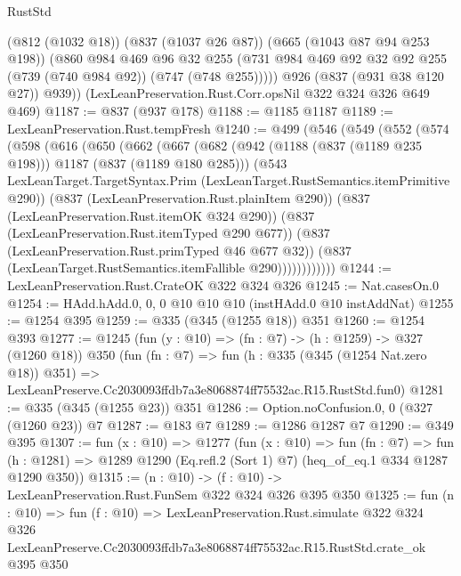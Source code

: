 \begin{lexlean}{RustStd}
\begin{coremodule}
          (@812 (@1032 @18))
          (@837 (@1037 @26 @87))
          (@665 (@1043 @87 @94 @253 @198))
          (@860
            @984
            @469
            @96
            @32
            @255
            (@731 @984 @469 @92 @32 @92 @255 (@739 (@740 @984 @92)) (@747 (@748 @255)))))
        @926
        (@837 (@931 @38 @120 @27))
        @939))
    (LexLeanPreservation.Rust.Corr.opsNil @322 @324 @326 @649 @469)
@1187 := @837 (@937 @178)
@1188 := @1185 @1187
@1189 := LexLeanPreservation.Rust.tempFresh
@1240 := @499
    (@546
      (@549
        (@552
          (@574
            (@598
              (@616
                (@650
                  (@662
                    (@667
                      (@682
                        (@942 (@1188 (@837 (@1189 @235 @198))) @1187 (@837 (@1189 @180 @285)))
                        (@543
                          LexLeanTarget.TargetSyntax.Prim
                          (LexLeanTarget.RustSemantics.itemPrimitive @290))
                        (@837 (LexLeanPreservation.Rust.plainItem @290))
                        (@837 (LexLeanPreservation.Rust.itemOK @324 @290))
                        (@837 (LexLeanPreservation.Rust.itemTyped @290 @677))
                        (@837 (LexLeanPreservation.Rust.primTyped @46 @677 @32))
                        (@837 (LexLeanTarget.RustSemantics.itemFallible @290))))))))))))
@1244 := LexLeanPreservation.Rust.CrateOK @322 @324 @326
@1245 := Nat.casesOn.{0}
@1254 := HAdd.hAdd.{0, 0, 0} @10 @10 @10 (instHAdd.{0} @10 instAddNat)
@1255 := @1254 @395
@1259 := @335 (@345 (@1255 @18)) @351
@1260 := @1254 @393
@1277 := @1245
    (fun (y : @10) => (fn : @7) -> (h : @1259) -> @327 (@1260 @18))
    @350
    (fun (fn : @7) =>
    fun (h : @335 (@345 (@1254 Nat.zero @18)) @351) =>
    LexLeanPreserve.Cc2030093ffdb7a3e8068874ff75532ac.R15.RustStd.fun0)
@1281 := @335 (@345 (@1255 @23)) @351
@1286 := Option.noConfusion.{0, 0} (@327 (@1260 @23)) @7
@1287 := @183 @7
@1289 := @1286 @1287 @7
@1290 := @349 @395
@1307 := fun (x : @10) =>
  @1277
    (fun (x : @10) =>
    fun (fn : @7) =>
    fun (h : @1281) => @1289 @1290 (Eq.refl.{2} (Sort 1) @7) (heq_of_eq.{1} @334 @1287 @1290 @350))
@1315 := (n : @10) -> (f : @10) -> LexLeanPreservation.Rust.FunSem @322 @324 @326 @395 @350
@1325 := fun (n : @10) =>
  fun (f : @10) =>
  LexLeanPreservation.Rust.simulate
    @322
    @324
    @326
    LexLeanPreserve.Cc2030093ffdb7a3e8068874ff75532ac.R15.RustStd.crate_ok
    @395
    @350
\end{coremodule}
\end{lexlean}
